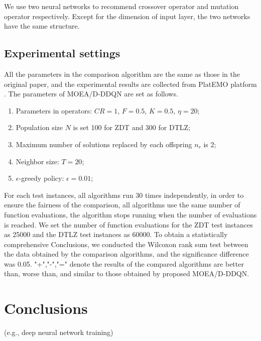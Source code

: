 \documentclass[journal]{IEEEtran}
\begin{document}
We use two neural networks to recommend crossover operator and mutation operator respectively. Except for the dimension of input layer, the two networks have the same structure.

\subsection{Experimental settings}
All the parameters in the comparison algorithm are the same as those in the original paper, and the experimental results are collected from PlatEMO platform \cite{PlatEMO}.
The parameters of MOEA/D-DDQN are set as follows.
\begin{enumerate}
  \item Parameters in operators: $CR=1$, $F=0.5$, $K=0.5$, $\eta=20$;
  \item Population size $N$ is set 100 for ZDT and 300 for DTLZ;
  \item Maximum number of solutions replaced by each offspring $n_r$ is 2;
  \item Neighbor size: $T=20$;
  \item $\epsilon$-greedy policy: $\epsilon=0.01$;
\end{enumerate}

For each test instances, all algorithms run 30 times independently, in order to ensure the fairness of the comparison, all algorithms use the same number of function evaluations,
the algorithm stops running when the number of evaluations is reached.
We set the number of function evaluations for the ZDT test instances as 25000 and the DTLZ test instances as 60000.
To obtain a statistically comprehensive Conclusions, we conducted the Wilcoxon rank sum test between the data obtained by the comparison algorithms, and the significance difference was 0.05.
"+","-","=" denote the results of the compared algorithms are better than, worse than, and similar to those obtained by proposed MOEA/D-DDQN.



\section{Conclusions}


 (e.g., deep neural network training)

\ifCLASSOPTIONcaptionsoff
  \newpage
\fi



\end{document}
